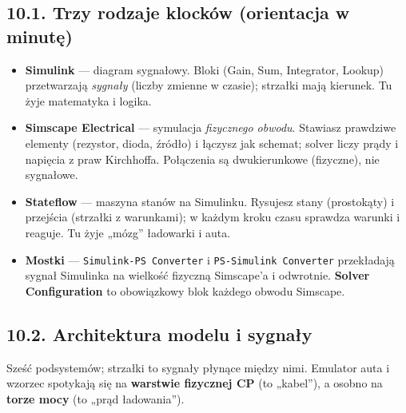 \documentclass[11pt]{article}
\newcommand{\key}[1]{\textbf{\color{navy}#1}}
\begin{document}
\subsection{10.1. Trzy rodzaje klocków (orientacja w minutę)}

\begin{itemize}
  \item \key{Simulink} --- diagram sygnałowy. Bloki (Gain, Sum, Integrator, Lookup) przetwarzają \emph{sygnały} (liczby zmienne w czasie); strzałki mają kierunek. Tu żyje matematyka i logika.
  \item \key{Simscape Electrical} --- symulacja \emph{fizycznego obwodu}. Stawiasz prawdziwe elementy (rezystor, dioda, źródło) i łączysz jak schemat; solver liczy prądy i napięcia z praw Kirchhoffa. Połączenia są dwukierunkowe (fizyczne), nie sygnałowe.
  \item \key{Stateflow} --- maszyna stanów na Simulinku. Rysujesz stany (prostokąty) i przejścia (strzałki z warunkami); w każdym kroku czasu sprawdza warunki i reaguje. Tu żyje „mózg'' ładowarki i auta.
  \item \key{Mostki} --- \texttt{Simulink-PS Converter} i \texttt{PS-Simulink Converter} przekładają sygnał Simulinka na wielkość fizyczną Simscape'a i odwrotnie. \key{Solver Configuration} to obowiązkowy blok każdego obwodu Simscape.
\end{itemize}

\subsection{10.2. Architektura modelu i sygnały}

Sześć podsystemów; strzałki to sygnały płynące między nimi. Emulator auta i wzorzec spotykają się na \key{warstwie fizycznej CP} (to „kabel''), a osobno na \key{torze mocy} (to „prąd ładowania'').
\end{document}
